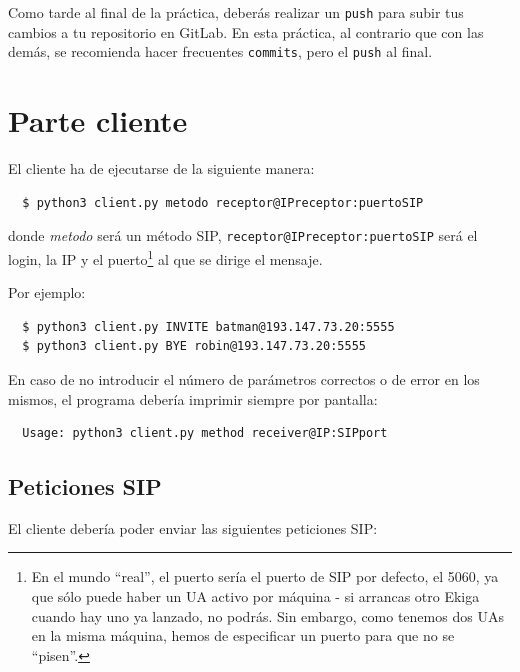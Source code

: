 \documentclass[a4paper,11pt]{article}
\begin{document}
 Como tarde al final de la práctica, deberás realizar un \texttt{push} para subir tus cambios a tu repositorio en GitLab. En esta práctica, al contrario que con las demás, se recomienda hacer frecuentes \texttt{commits}, pero el \texttt{push} al final.


\section*{Parte cliente}

El cliente ha de ejecutarse de la siguiente manera:
\begin{verbatim}
  $ python3 client.py metodo receptor@IPreceptor:puertoSIP
\end{verbatim}

donde \emph{metodo} será un método SIP, \texttt{receptor@IPreceptor:puertoSIP}
será el login, la IP y el puerto\footnote{En el mundo ``real'', el puerto sería 
el puerto de SIP por defecto, el 5060, ya que sólo puede haber un UA activo
por máquina - si arrancas otro Ekiga cuando hay uno ya lanzado, no podrás.
Sin embargo, como tenemos dos UAs en la
misma máquina, hemos de especificar un puerto para que no se ``pisen''.}
al que se dirige el mensaje.

Por ejemplo:
\begin{verbatim}
  $ python3 client.py INVITE batman@193.147.73.20:5555
  $ python3 client.py BYE robin@193.147.73.20:5555
\end{verbatim}

En caso de no introducir el número de parámetros correctos o de error en los mismos, el programa debería imprimir siempre por pantalla:

\begin{verbatim}
  Usage: python3 client.py method receiver@IP:SIPport
\end{verbatim}

\subsection*{Peticiones SIP}

El cliente debería poder enviar las siguientes peticiones SIP:
\end{document}
